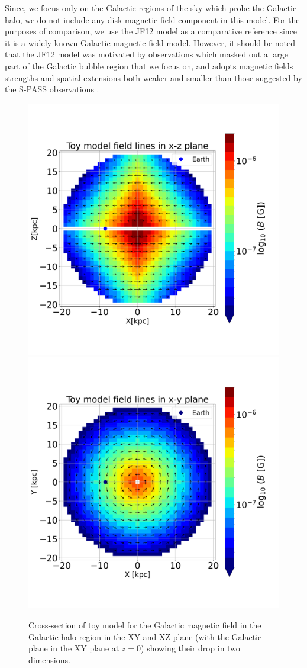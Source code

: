 \documentclass[usenatbib]{mnras}
\begin{document}
Since, we focus only on the Galactic regions of the sky which probe the Galactic halo, we do not include any disk magnetic field component in this model. For the purposes of comparison, we use the JF12 model as a comparative reference since it is a widely known Galactic magnetic field model.
However, it should be noted that the JF12 model was motivated by observations which masked out a large part of the Galactic bubble region that we focus on, and adopts magnetic fields strengths and spatial extensions both weaker and smaller than those suggested by the S-PASS observations \cite{Carretti_2013}.
\begin{figure}
\centering
\includegraphics[width = 0.49\linewidth]{Images/ToyModel_BestFit_XZ.png}%
\includegraphics[width = 0.49\linewidth]{Images/ToyModel_BestFit_XY.png}
\caption{Cross-section of toy model for the Galactic magnetic field in the Galactic halo region in the XY and XZ plane (with the Galactic plane in the XY plane at $z=0$) showing their drop in two dimensions.}
\label{fig:Vis_TM}
\end{figure}

\end{document}
